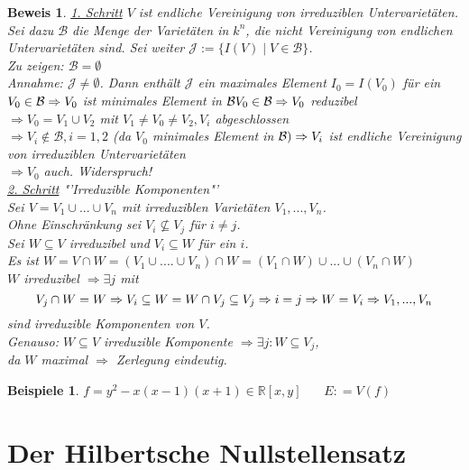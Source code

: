 \documentclass[a4paper,12pt]{report}
\theoremstyle{break}
\newtheorem{Bsp}[Def]{Beispiele}
\theoremstyle{nonumberbreak}
\theoremstyle{nonumberplain}
\newtheorem{Bew}{Beweis}
\newcommand{\defeqr}[0]{\mathrel{\mathop:}=}
\begin{document}
\begin{Bew}
\underline{1. Schritt} $V$ ist endliche Vereinigung von irreduziblen Untervarietäten.\\
Sei dazu $\mathcal{B}$ die Menge der Varietäten in $k^n$, die nicht Vereinigung von endlichen Untervarietäten sind. Sei weiter $\mathcal{J}:=\{ I(V)\mid V\in \mathcal{B}\}$.\\
Zu zeigen: $\mathcal{B}=\emptyset$\\
Annahme: $\mathcal{J}\neq \emptyset$. Dann enthält $\mathcal{J}$ ein maximales Element $I_0=I(V_0)$ für ein $V_0\in \mathcal{B}\\
\Rightarrow V_0$ ist minimales Element in $\mathcal{B}\\
V_0 \in \mathcal{B} \Rightarrow V_0$ reduzibel\\
$\Rightarrow V_0 = V_1 \cup V_2$ mit $V_1\neq V_0\neq V_2, V_i$ abgeschlossen\\
$\Rightarrow V_i \notin\mathcal{B}, i=1,2$ (da $V_0$ minimales Element in $\mathcal{B})\\
\Rightarrow V_i$ ist endliche Vereinigung von irreduziblen Untervarietäten\\
$\Rightarrow V_0$ auch. Widerspruch!\\
\underline{2. Schritt} "'Irreduzible Komponenten"'\\
Sei $V=V_1\cup ... \cup V_n$ mit irreduziblen Varietäten $V_1,... , V_n$.
\\Ohne Einschränkung sei $V_i\nsubseteq V_j$ für $i\neq j$.\\
Sei $W\subseteq V$ irreduzibel und $V_i\subseteq W$ für ein $i$.\\
Es ist $W=V\cap W= (V_1 \cup .... \cup V_n)\cap W= (V_1 \cap W)\cup ... \cup (V_n \cap W)$\\
$W$ irreduzibel $\Rightarrow\exists j$ mit 
\[
V_j\cap W = W\\
\Rightarrow V_i \subseteq W= W \cap V_j\subseteq V_j\Rightarrow i=j \Rightarrow W=V_i\\
\Rightarrow V_1,..., V_n
\]
 sind irreduzible Komponenten von $V$.\\
Genauso: $W\subseteq V$ irreduzible Komponente $\Rightarrow \exists j : W \subseteq V_j$,\\
da $W$ maximal $\Rightarrow$ Zerlegung eindeutig.
\end{Bew}
\begin{Bsp}
$f=y^2-x(x-1)(x+1) \in\mathbb{R}[x,y]~~~~~~~~E\defeqr V(f)$
\end{Bsp}
\section{Der Hilbertsche Nullstellensatz}
\end{document}
